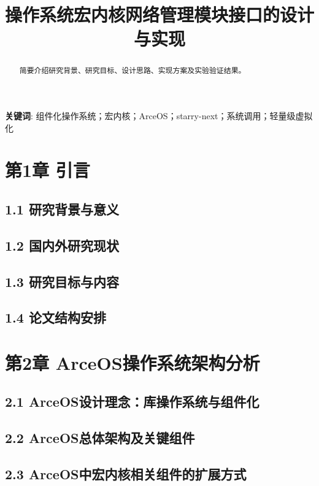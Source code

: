 \documentclass{article}
\title{操作系统宏内核网络管理模块接口的设计与实现}
\author{}
\date{}
\begin{document}
\maketitle

\begin{abstract}
简要介绍研究背景、研究目标、设计思路、实现方案及实验验证结果。
\end{abstract}

\textbf{关键词}: 组件化操作系统；宏内核；ArceOS；starry-next；系统调用；轻量级虚拟化

\section{第1章 引言}

\subsection{1.1 研究背景与意义}

\subsection{1.2 国内外研究现状}

\subsection{1.3 研究目标与内容}

\subsection{1.4 论文结构安排}

\section{第2章 ArceOS操作系统架构分析}

\subsection{2.1 ArceOS设计理念：库操作系统与组件化}

\subsection{2.2 ArceOS总体架构及关键组件}

\subsection{2.3 ArceOS中宏内核相关组件的扩展方式}
\end{document}
